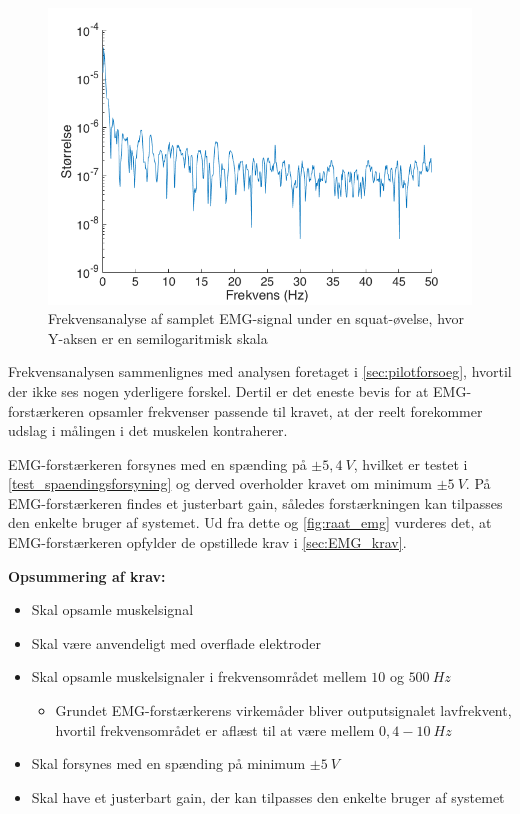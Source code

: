 \begin{figure}[H]
\centering
\includegraphics[width=1\textwidth]{figures/fft_raat_EMG}
\caption{Frekvensanalyse af samplet EMG-signal under en squat-øvelse, hvor Y-aksen er en semilogaritmisk skala}
\label{fig:fft_raat_emg}
\end{figure}

\noindent
Frekvensanalysen sammenlignes med analysen foretaget i \autoref{sec:pilotforsoeg}, hvortil der ikke ses nogen yderligere forskel. Dertil er det eneste bevis for at EMG-forstærkeren opsamler frekvenser passende til kravet, at der reelt forekommer udslag i målingen i det muskelen kontraherer.    
 
EMG-forstærkeren forsynes med en spænding på $\pm 5,4~V$, hvilket er testet i \autoref{test_spaendingsforsyning} og derved overholder kravet om minimum $\pm 5~V$.
På EMG-forstærkeren findes et justerbart gain, således forstærkningen kan tilpasses den enkelte bruger af systemet. Ud fra dette og \autoref{fig:raat_emg} vurderes det, at EMG-forstærkeren opfylder de opstillede krav i \autoref{sec:EMG_krav}.

\vspace{3mm}
\textbf{Opsummering af krav:}
\begin{itemize}
\item[\text{\sffamily \checkmark}] Skal opsamle muskelsignal
\item[\text{\sffamily \checkmark}] Skal være anvendeligt med overflade elektroder
\item Skal opsamle muskelsignaler i frekvensområdet mellem $10$ og $500~Hz$
\begin{itemize}
\item[\text{\sffamily \checkmark}] Grundet EMG-forstærkerens virkemåder bliver outputsignalet lavfrekvent, hvortil frekvensområdet er aflæst til at være mellem $0,4-10~Hz$
\end{itemize}
\item[\text{\sffamily \checkmark}] Skal forsynes med en spænding på minimum $\pm5~V$
\item[\text{\sffamily \checkmark}] Skal have et justerbart gain, der kan tilpasses den enkelte bruger af systemet
\end{itemize}


